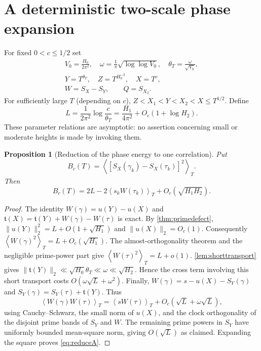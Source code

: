 \documentclass[11pt,reqno]{amsart}
\numberwithin{equation}{section}
\newtheorem{proposition}[theorem]{Proposition}
\newcommand{\av}[1]{\left\langle #1\right\rangle_T}
\begin{document}
\section{A deterministic two-scale phase expansion}\label{sec:twoscale}
For fixed $0<c\le1/2$ set
\begin{equation}\label{eq:transparams}
\begin{gathered}
V_0=\frac{H_0}{2\pi^2},\quad
\omega=\frac1\pi\sqrt{\log\log V_0},\quad
\theta_T=\frac{\omega}{\sqrt{V_0}},\\
Y=T^{\theta_T},\quad Z=T^{H_0^{-2}},\quad X=T^c,\\
W=S_X-S_Y,\qquad Q=S_{X_2}.
\end{gathered}
\end{equation}
For sufficiently large $T$ (depending on $c$),
$Z<X_1<Y<X_2<X\le T^{1/2}$.  Define
\begin{equation}\label{eq:bandenergy}
L=\frac1{2\pi^2}\log\frac c{\theta_T}
 =\frac{H_1}{4\pi^2}+O_c(1+\log H_2).
\end{equation}
These parameter relations are asymptotic: no assertion concerning
small or moderate heights is made by invoking them.

\begin{proposition}[Reduction of the phase energy to one correlation]
\label{prop:reduceA}
Put
\[
 B_c(T)=\av{[S_X(\gamma_k)-S_X(\tau_k)]^2}.
\]
Then
\begin{equation}\label{eq:reduceA}
B_c(T)=2L-2\av{s_kW(\tau_k)}
 +O_c(\sqrt{H_1H_2}).
\end{equation}
\end{proposition}
\begin{proof}
The identity $W(\gamma)=u(Y)-u(X)$ and
$\mathfrak t(X)=\mathfrak t(Y)+W(\gamma)-W(\tau)$ is exact.
By \cref{thm:primedefect},
$\|u(Y)\|_2^2=L+O(1+\sqrt{H_1})$ and
$\|u(X)\|_2=O_c(1)$.  Consequently
$\av{W(\gamma)^2}=L+O_c(\sqrt{H_1})$.
The almost-orthogonality theorem and the negligible prime-power
part give $\av{W(\tau)^2}=L+o(1)$.
\cref{lem:shorttransport} gives
$\|\mathfrak t(Y)\|_2\ll\sqrt{H_0}\theta_T
\ll\omega\ll\sqrt{H_2}$.  Hence the cross term involving this
short transport costs $O(\omega\sqrt L+\omega^2)$.
Finally,
$W(\gamma)=s-u(X)-S_Y(\gamma)$ and
$S_Y(\gamma)=S_Y(\tau)+\mathfrak t(Y)$.
Thus
\[
\av{W(\gamma)W(\tau)}
 =\av{sW(\tau)}+O_c(\sqrt L+\omega\sqrt L),
\]
using Cauchy--Schwarz, the small norm of $u(X)$, and the
clock orthogonality of the disjoint prime bands of $S_Y$ and $W$.
The remaining prime powers in $S_Y$ have uniformly bounded
mean-square norm, giving $O(\sqrt L)$ as claimed.
Expanding the square proves \eqref{eq:reduceA}.
\end{proof}
\end{document}
